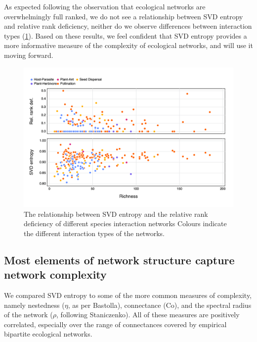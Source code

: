 As expected following the observation that ecological networks are
overwhelmingly full ranked, we do not see a relationship between SVD entropy and
relative rank deficiency, neither do we observe differences between interaction
types (\ref{fig:entropy_v_rank}). Based on these results, we feel confident that
SVD entropy provides a more informative measure of the complexity of ecological
networks, and will use it moving forward.

\begin{figure}[h]
    \centering
    \includegraphics[width=\textwidth]{figures/size_v_rankentropy.png}
    \caption{The relationship between SVD entropy and the relative rank
deficiency of different species interaction networks Colours indicate the
different interaction types of the networks.}
    \label{fig:entropy_v_rank}
\end{figure}

\subsection{Most elements of network structure capture network
complexity}\label{most-elements-of-network-structure-capture-network-complexity}

We compared SVD entropy to some of the more common measures of complexity,
namely nestedness (\(\eta\), as per Bastolla\cite{Bastolla2009ArcMut}),
connectance (\(\text{Co}\)), and the spectral radius of the network (\(\rho\),
following Staniczenko\cite{Staniczenko2013GhoNes}). All of these measures are
positively correlated, especially over the range of connectances covered by
empirical bipartite ecological networks.

